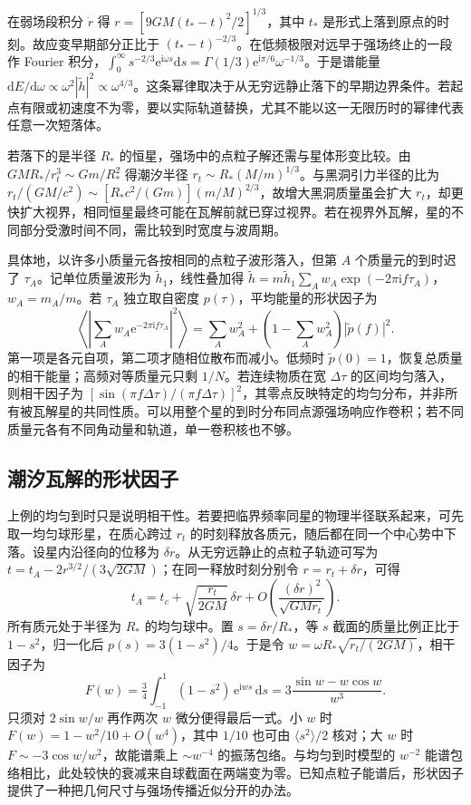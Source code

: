 在弱场段积分 $\dot r$ 得 $r=[9GM(t_*-t)^2/2]^{1/3}$，其中 $t_*$ 是形式上落到原点的时刻。故应变早期部分正比于 $(t_*-t)^{-2/3}$。在低频极限对远早于强场终止的一段作 Fourier 积分，$\int_0^\infty s^{-2/3}\mathrm e^{\mathrm i\omega s}\mathrm ds=\Gamma(1/3)\mathrm e^{\mathrm i\pi/6}\omega^{-1/3}$。于是谱能量 $\mathrm dE/\mathrm d\omega\propto\omega^2|\widetilde h|^2\propto\omega^{4/3}$。这条幂律取决于从无穷远静止落下的早期边界条件。若起点有限或初速度不为零，要以实际轨道替换，尤其不能以这一无限历时的幂律代表任意一次短落体。

若落下的是半径 $R_*$ 的恒星，强场中的点粒子解还需与星体形变比较。由 $GM R_*/r_t^3\sim Gm/R_*^2$ 得潮汐半径 $r_t\sim R_*(M/m)^{1/3}$。与黑洞引力半径的比为 $r_t/(GM/c^2)\sim [R_*c^2/(Gm)](m/M)^{2/3}$，故增大黑洞质量虽会扩大 $r_t$，却更快扩大视界，相同恒星最终可能在瓦解前就已穿过视界。若在视界外瓦解，星的不同部分受激时间不同，需比较到时宽度与波周期。

具体地，以许多小质量元各按相同的点粒子波形落入，但第 $A$ 个质量元的到时迟了 $\tau_A$。记单位质量波形为 $\widetilde h_1$，线性叠加得 $\widetilde h=m\widetilde h_1\sum_A w_A\exp(-2\pi\mathrm i f\tau_A)$，$w_A=m_A/m$。若 $\tau_A$ 独立取自密度 $p(\tau)$，平均能量的形状因子为
\[
 \left\langle\left|\sum_A w_A\mathrm e^{-2\pi\mathrm i f\tau_A}\right|^2\right\rangle
 =\sum_A w_A^2+\left(1-\sum_A w_A^2\right)|\widetilde p(f)|^2 .
\]
第一项是各元自项，第二项才随相位散布而减小。低频时 $\widetilde p(0)=1$，恢复总质量的相干能量；高频对等质量元只剩 $1/N$。若连续物质在宽 $\Delta\tau$ 的区间均匀落入，则相干因子为 $[\sin(\pi f\Delta\tau)/(\pi f\Delta\tau)]^2$，其零点反映特定的均匀分布，并非所有被瓦解星的共同性质。可以用整个星的到时分布同点源强场响应作卷积；若不同质量元各有不同角动量和轨道，单一卷积核也不够。

\subsection{潮汐瓦解的形状因子}

上例的均匀到时只是说明相干性。若要把临界频率同星的物理半径联系起来，可先取一均匀球形星，在质心跨过 $r_t$ 的时刻释放各质元，随后都在同一个中心势中下落。设星内沿径向的位移为 $\delta r$。从无穷远静止的点粒子轨迹可写为 $t=t_A-2r^{3/2}/(3\sqrt{2GM})$；在同一释放时刻分别令 $r=r_t+\delta r$，可得
\[
 t_A=t_c+\sqrt{\frac{r_t}{2GM}}\,\delta r
                 +O\!\left(\frac{(\delta r)^2}{\sqrt{GM r_t}}\right).
\]
所有质元处于半径为 $R_*$ 的均匀球中。置 $s=\delta r/R_*$，等 $s$ 截面的质量比例正比于 $1-s^2$，归一化后 $p(s)=3(1-s^2)/4$。于是令 $w=\omega R_*\sqrt{r_t/(2GM)}$，相干因子为
\[
 F(w)=\tfrac34\int_{-1}^1(1-s^2)\,\mathrm e^{\mathrm iws}\,\mathrm ds
     =3\frac{\sin w-w\cos w}{w^3} .
\]
只须对 $2\sin w/w$ 再作两次 $w$ 微分便得最后一式。小 $w$ 时 $F(w)=1-w^2/10+O(w^4)$，其中 $1/10$ 也可由 $\langle s^2\rangle/2$ 核对；大 $w$ 时 $F\sim-3\cos w/w^2$，故能谱乘上 $\sim w^{-4}$ 的振荡包络。与均匀到时模型的 $w^{-2}$ 能谱包络相比，此处较快的衰减来自球截面在两端变为零。已知点粒子能谱后，形状因子提供了一种把几何尺寸与强场传播近似分开的办法。


